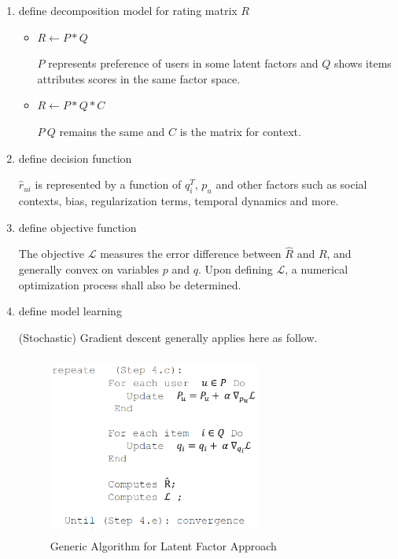 \documentclass[letter paper, 11pt]{article}
\begin{document}
	\begin{enumerate}
		\item define decomposition model for rating matrix $R$
		
		\begin{itemize}
			\item $ R \leftarrow P * Q $ 
			
			$P$ represents preference of users in some latent factors and $Q$ shows items attributes scores in the same factor space.
			
			\item $ R \leftarrow P * Q * C$
			
			$P\ Q$ remains the same and $C$ is the matrix for context.
		\end{itemize}
		
		\item define decision function
		
		$\hat{r}_{ui}$ is represented by a function of $q_i^T$, $p_u$ and other factors such as social contexts, bias, regularization terms, temporal dynamics and more.
		
		
		\item define objective function
		
		The objective $\mathcal{L}$ measures the error difference between $\hat{R}$ and $R$, and generally convex on variables $p$ and $q$. Upon defining $\mathcal{L}$, a numerical optimization process shall also be determined.
		
		\item define model learning
		
		(Stochastic) Gradient descent generally applies here as follow. 
		\begin{figure}[h]
			\caption{Generic Algorithm for Latent Factor Approach\cite{latentFactor-RS}}
			\centering
			\includegraphics[width=7cm, height=6cm]{Latent-factor-Framework1.png}
		\end{figure}
		
	\end{enumerate}
\end{document}
